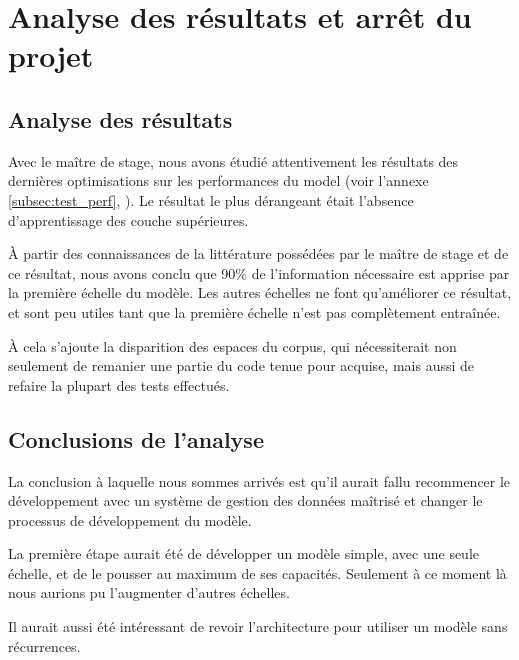 \section{Analyse des résultats et arrêt du projet}\label{white_flag}



\subsection{Analyse des résultats}
Avec le maître de stage, nous avons étudié attentivement les résultats des dernières optimisations sur les performances du \gls{model} (voir l'annexe \ref{subsec:test_perf}, ). 
Le résultat le plus dérangeant était l'absence d'apprentissage des couche supérieures.

À partir des connaissances de la littérature possédées par le maître de stage et de ce résultat, nous avons conclu que 90\% de l'information nécessaire est apprise par la première échelle du modèle. Les autres échelles ne font qu'améliorer ce résultat, et sont peu utiles tant que la première échelle n'est pas complètement entraînée.

À cela s'ajoute la disparition des espaces du corpus, qui nécessiterait non seulement de remanier une partie du code tenue pour acquise, mais aussi de refaire la plupart des tests effectués.

\subsection{Conclusions de l'analyse}
La conclusion à laquelle nous sommes arrivés est qu'il aurait fallu recommencer le développement avec un système de gestion des données maîtrisé et changer le processus de développement du modèle.

La première étape aurait été de développer un modèle simple, avec une seule échelle, et de le pousser au maximum de ses capacités. Seulement à ce moment là nous aurions pu l'augmenter d'autres échelles.

Il aurait aussi été intéressant de revoir l'architecture pour utiliser un modèle sans récurrences.

